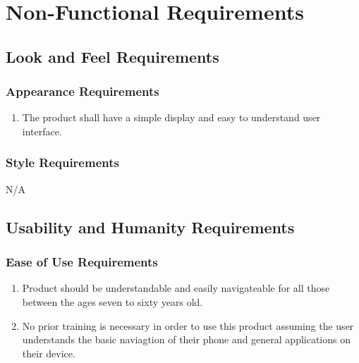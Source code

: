 \documentclass[]{article}
\begin{document}

\section{Non-Functional Requirements}
\label{sec:non-functional_requirements}
\subsection{Look and Feel Requirements}
\label{sub:look_and_feel_requirements}

\subsubsection{Appearance Requirements}
\label{ssub:appearance_requirements}
\begin{enumerate}[{LF}1. ]
	\item The product shall have a simple display and easy to understand user interface.
\end{enumerate}

\subsubsection{Style Requirements}
\label{ssub:style_requirements}
	 N/A


\subsection{Usability and Humanity Requirements}
\label{sub:usability_and_humanity_requirements}

\subsubsection{Ease of Use Requirements}
\label{ssub:ease_of_use_requirements}
\begin{enumerate}[{UH}1. ]
	\item Product should be understandable and easily navigateable for all those between the ages seven to sixty years old.
	\item No prior training is necessary in order to use this product assuming the user understands the basic naviagtion of their phone and general applications on their device.
\end{enumerate}
\end{document}
